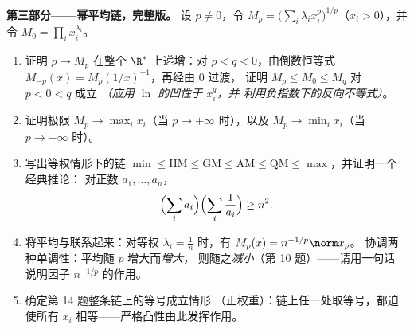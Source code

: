 \begin{problem}
\medskip
\noindent\textbf{第三部分——幂平均链，完整版。}
设 $p \neq 0$，令 $M_p = \bigl(\sum_i\lambda_i
x_i^p\bigr)^{1/p}$（$x_i > 0$），并令 $M_0 = \prod_i
x_i^{\lambda_i}$。
\begin{enumerate}[resume]
  \item 证明 $p \mapsto M_p$ 在整个
        $\R^*$ 上递增：对 $p < q < 0$，由倒数恒等式
        $M_{-p}(x) = M_p(1/x)^{-1}$，再经由 $0$ 过渡，
        证明 $M_p \leq M_0 \leq M_q$ 对 $p < 0 < q$ 成立
        \emph{（应用 $\ln$ 的凹性于 $x_i^q$，并
        利用负指数下的反向不等式）}。
  \item 证明极限 $M_p \to \max_i x_i$（当 $p \to
        +\infty$ 时），以及 $M_p \to \min_i x_i$（当 $p \to -\infty$ 时）。
  \item 写出等权情形下的链 $\min \leq \mathrm{HM} \leq
        \mathrm{GM} \leq \mathrm{AM} \leq \mathrm{QM} \leq
        \max$，并证明一个经典推论：
        对正数 $a_1, \dots, a_n$，
        \[
        \Bigl(\sum_i a_i\Bigr)\Bigl(\sum_i\frac1{a_i}\Bigr)
        \geq n^2 .
        \]
  \item 将平均与联系起来：对等权 $\lambda_i =
        \frac1n$ 时，有 $M_p(x) = n^{-1/p}\norm x_p$。
        协调两种单调性：平均随 $p$ 增大而\emph{增大}，
        则随之\emph{减小}（第 10 题）——请用一句话
        说明因子 $n^{-1/p}$ 的作用。
  \item 确定第 14 题整条链上的等号成立情形
        （正权重）：链上任一处取等号，都迫使所有 $x_i$
        相等——严格凸性由此发挥作用。
\end{enumerate}


\end{problem}
